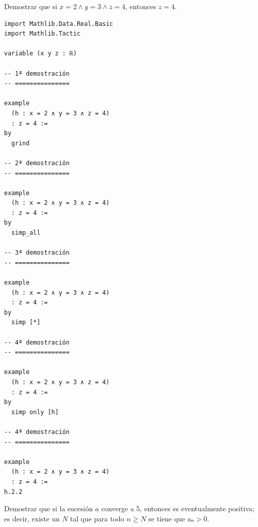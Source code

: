 \begin{ejercicio}
  Demostrar que si $x = 2 ∧ y = 3 ∧ z = 4$, entonces $z=4$.
\end{ejercicio}


\begin{verbatim}
import Mathlib.Data.Real.Basic
import Mathlib.Tactic

variable (x y z : ℝ)

-- 1ª demostración
-- ===============

example
  (h : x = 2 ∧ y = 3 ∧ z = 4)
  : z = 4 :=
by
  grind

-- 2ª demostración
-- ===============

example
  (h : x = 2 ∧ y = 3 ∧ z = 4)
  : z = 4 :=
by
  simp_all

-- 3ª demostración
-- ===============

example
  (h : x = 2 ∧ y = 3 ∧ z = 4)
  : z = 4 :=
by
  simp [*]

-- 4ª demostración
-- ===============

example
  (h : x = 2 ∧ y = 3 ∧ z = 4)
  : z = 4 :=
by
  simp only [h]

-- 4ª demostración
-- ===============

example
  (h : x = 2 ∧ y = 3 ∧ z = 4)
  : z = 4 :=
h.2.2
\end{verbatim}

\begin{ejercicio}
  Demostrar que si la sucesión $a$ converge a 5, entonces es
  eventualmente positiva; es decir, existe un $N$ tal que para todo $n ≥ N$
  se tiene que $aₙ > 0$.
\end{ejercicio}

